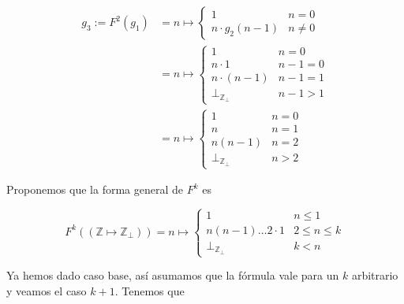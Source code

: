 \documentclass[a4paper, 12pt]{article}
\begin{document}
\begin{align*}
  g_3 := F^2\left( g_1 \right)  
  &=
  n \mapsto \begin{cases}
    1 & n = 0 \\ 
    n \cdot g_2(n - 1) & n \neq 0
  \end{cases} \\ 
  &= n\mapsto \begin{cases}
    1 & n = 0 \\ 
    n \cdot 1 & n - 1 = 0 \\ 
    n \cdot (n-1) & n - 1 = 1 \\ 
    \bot_{\mathbb{Z}_\bot } & n - 1 > 1
  \end{cases} \\
  &= n\mapsto \begin{cases}
    1 & n = 0 \\ 
    n & n = 1 \\ 
    n(n-1) & n = 2 \\ 
    \bot_{\mathbb{Z}_\bot } & n > 2
  \end{cases} 
\end{align*}

Proponemos que la forma general de $F^k$ es 

\begin{equation*}
  F^k(\left( \mathbb{Z} \mapsto \mathbb{Z}_\bot  \right)) = n \mapsto \begin{cases}
    1 & n \leq 1 \\ 
    n(n-1)\ldots 2 \cdot 1 & 2 \leq n \leq k \\ 
    \bot_{\mathbb{Z}_\bot } & k < n
  \end{cases}
\end{equation*}

Ya hemos dado caso base, así asumamos que la fórmula vale para un $k$ arbitrario
y veamos el caso $k + 1$. Tenemos que 
\end{document}
